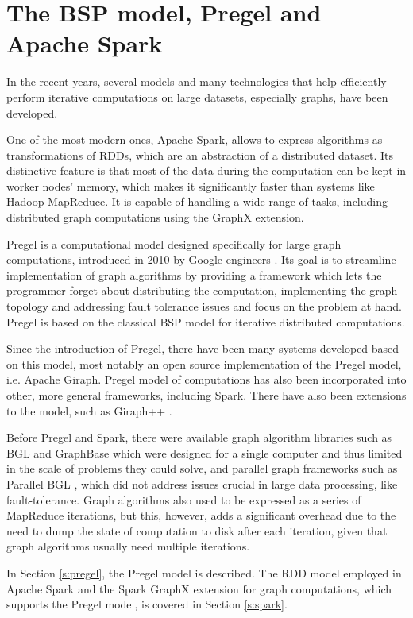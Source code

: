 
\chapter{The BSP model, Pregel and Apache Spark}\label{r:pregel}
In the recent years, several models and many technologies that help efficiently perform iterative computations on large datasets, especially graphs, have been developed.

One of the most modern ones, Apache Spark, allows to express algorithms as transformations of RDDs, which are an abstraction of a distributed dataset. Its distinctive feature is that most of the data during the computation can be kept in worker nodes' memory, which makes it significantly faster than systems like Hadoop MapReduce. It is capable of handling a wide range of tasks, including distributed graph computations using the GraphX extension.

Pregel is a computational model designed specifically for large graph computations, introduced in 2010 by Google engineers \cite{pregel}. Its goal is to streamline implementation of graph algorithms by providing a framework which lets the programmer forget about distributing the computation, implementing the graph topology and addressing fault tolerance issues and focus on the problem at hand. Pregel is based on the classical BSP model \cite{bsp} for iterative distributed computations.

Since the introduction of Pregel, there have been many systems developed based on this model, most notably an open source implementation of the Pregel model, i.e. Apache Giraph. Pregel model of computations has also been incorporated into other, more general frameworks, including Spark. There have also been extensions to the model, such as Giraph++ \cite{giraphpp}.

Before Pregel and Spark, there were available graph algorithm libraries such as BGL \cite{bgl} and GraphBase \cite{GraphBase} which were designed for a single computer and thus limited in the scale of problems they could solve, and parallel graph frameworks such as Parallel BGL \cite{parallelbgl}, which did not address issues crucial in large data processing, like fault-tolerance. Graph algorithms also used to be expressed as a series of MapReduce iterations, but this, however, adds a significant overhead due to the need to dump the state of computation to disk after each iteration, given that graph algorithms usually need multiple iterations.

In Section \ref{s:pregel}, the Pregel model is described. The RDD model employed in Apache Spark and the Spark GraphX extension for graph computations, which supports the Pregel model, is covered in Section \ref{s:spark}.

